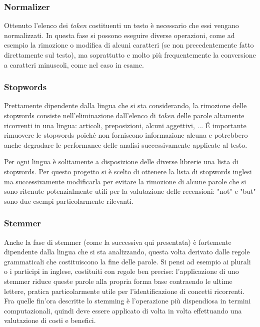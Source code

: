 \documentclass[hidelinks, 12pt]{article}
\begin{document}
\subsubsection{Normalizer}

Ottenuto l'elenco dei \textit{token} costituenti un testo è necessario che essi vengano normalizzati. In questa fase si possono eseguire diverse operazioni, come ad esempio la rimozione o modifica di alcuni caratteri (se non precedentemente fatto direttamente sul testo), ma soprattutto e molto più frequentemente la conversione a caratteri minuscoli, come nel caso in esame.


\subsubsection{Stopwords}

Prettamente dipendente dalla lingua che si sta considerando, la rimozione delle stopwords consiste nell'eliminazione dall'elenco di \textit{token} delle parole altamente ricorrenti in una lingua: articoli, preposizioni, alcuni aggettivi, ... É importante rimuovere le stopwords poiché non forniscono informazione alcuna e potrebbero anche degradare le performance delle analisi successivamente applicate al testo.

Per ogni lingua è solitamente a disposizione delle diverse librerie una lista di stopwords. Per questo progetto si è scelto di ottenere la lista di stopwords inglesi ma successivamente modificarla per evitare la rimozione di alcune parole che si sono ritenute potenzialmente utili per la valutazione delle recensioni: "not" e "but" sono due esempi particolarmente rilevanti.


\subsubsection{Stemmer}

Anche la fase di stemmer (come la successiva qui presentata) è fortemente dipendente dalla lingua che si sta analizzando, questa volta derivato dalle regole grammaticali che costituiscono la fine delle parole. Si pensi ad esempio ai plurali o i participi in inglese, costituiti con regole ben precise: l'applicazione di uno stemmer riduce queste parole alla propria forma base contraendo le ultime lettere, pratica particolarmente utile per l'identificazione di concetti ricorrenti. Fra quelle fin'ora descritte lo stemming è l'operazione più dispendiosa in termini computazionali, quindi deve essere applicato di volta in volta effettuando una valutazione di costi e benefici.
\end{document}
